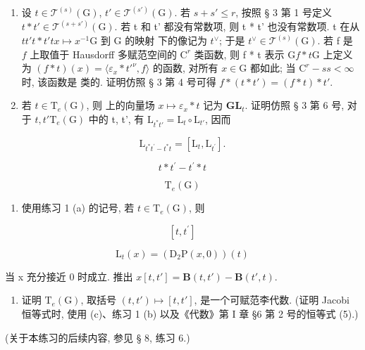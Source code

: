 \begin{enumerate}
\def\labelenumi{(\alph{enumi})}
\item
  设 \(t \in \mathcal{T}^{(s)}(\mathrm{G})\), \(t' \in \mathcal{T}^{(s')}(\mathrm{G})\). 若 \(s + s' \leqslant r\), 按照 § 3 第 1 号定义 \(t * t' \in \mathcal{T}^{(s + s')}(\mathrm{G})\). 若 t 和 t' 都没有常数项, 则 t * t' 也没有常数项. t 在从 \(t\)\(t'\)\(t * t'\)\(t\)\(x \mapsto x^{-1}\)\(\mathrm{G}\) 到 \(\mathrm{G}\) 的映射  下的像记为 \(t^{\vee}\); 于是 \(t^{\vee} \in \mathcal{T}^{(s)}(\mathrm{G})\). 若 f 是 \(f\) 上取值于 Hausdorff 多赋范空间的 \(\mathrm{C}^r\) 类函数, 则 f * t 表示 \(\mathrm{G}\)\(f * t\)\(\mathrm{G}\) 上定义为 \((f * t)(x) = \langle \varepsilon_x * t'^{\nu}, f \rangle\) 的函数, 对所有 \(x \in \mathrm{G}\) 都如此; 当 \(\mathrm{C}^r - s\)\(s < \infty\) 时, 该函数是  类的. 证明仿照 § 3 第 4 号可得 \(f * (t * t') = (f * t) * t'\).
\item
  若 \(t \in \mathrm{T}_e(\mathrm{G})\), 则  上的向量场 \(x \mapsto \varepsilon_x * t\) 记为 \(\mathbf{G}\)\(\mathbf{L}_t\). 证明仿照 § 3 第 6 号, 对于 \(t, t'\)\(\mathrm{T}_e(\mathrm{G})\) 中的 t, t', 有 \(\mathrm{L}_{t^* t'} = \mathrm{L}_t \circ \mathrm{L}_{t'}\), 因而
\end{enumerate}

\[
\mathrm{L} _ {t ^ {*} t ^ {\prime} - t ^ {*} t} = \left[ \mathrm{L} _ {t}, \mathrm{L} _ {t ^ {\prime}} \right].
\]

\[
t * t ^ {\prime} - t ^ {\prime} * t
\]

\[
\mathrm{T} _ {e} (\mathrm{G})
\]

\begin{enumerate}
\def\labelenumi{(\alph{enumi})}
\setcounter{enumi}{2}
\tightlist
\item
  使用练习 1 (a) 的记号, 若 \(t \in \mathrm{T}_e(\mathrm{G})\), 则
\end{enumerate}

\[
[ t, t ^ {\prime} ]
\]

\[
\mathrm{L} _ {t} (x) = (\mathrm{D} _ {2} \mathrm{P} (x, 0)) (t)
\]

当 x 充分接近 0 时成立. 推出 \(x\)\([t, t'] = \mathbf{B}(t, t') - \mathbf{B}(t', t)\).

\begin{enumerate}
\def\labelenumi{(\alph{enumi})}
\setcounter{enumi}{3}
\tightlist
\item
  证明 \(\mathrm{T}_e(\mathrm{G})\), 取括号 \((t, t') \mapsto [t, t']\), 是一个可赋范李代数. (证明 Jacobi 恒等式时, 使用 (c)、练习 1 (b) 以及《代数》第 I 章 §6 第 2 号的恒等式 (5).)
\end{enumerate}

(关于本练习的后续内容, 参见 § 8, 练习 6.)

